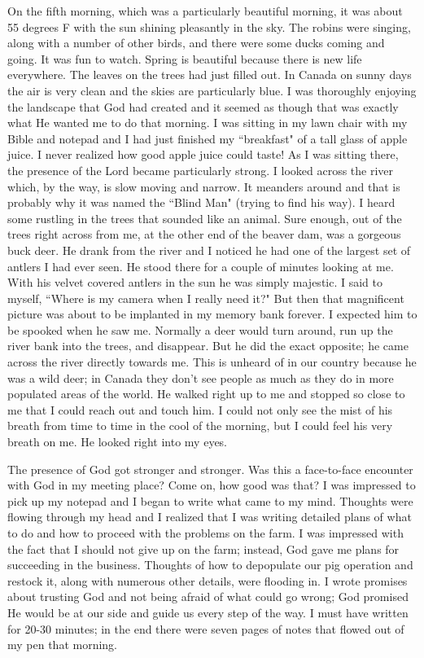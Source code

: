 \documentclass[oneside,12pt]{book}
\begin{document}
On the fifth morning, which was a particularly beautiful morning, it was about 55 degrees F with the sun shining pleasantly in the sky. The robins were singing, along with a number of other birds, and there were some ducks coming and going. It was fun to watch. Spring is beautiful because there is new life everywhere. The leaves on the trees had just filled out. In Canada on sunny days the air is very clean and the skies are particularly blue. I was thoroughly enjoying the landscape that God had created and it seemed as though that was exactly what He wanted me to do that morning. I was sitting in my lawn chair with my Bible and notepad and I had just finished my ``breakfast" of a tall glass of apple juice. I never realized how good apple juice could taste! As I was sitting there, the presence of the Lord became particularly strong. I looked across the river which, by the way, is slow moving and narrow. It meanders around and that is probably why it was named the ``Blind Man" (trying to find his way). I heard some rustling in the trees that sounded like an animal. Sure enough, out of the trees right across from me, at the other end of the beaver dam, was a gorgeous buck deer. He drank from the river and I noticed he had one of the largest set of antlers I had ever seen. He stood there for a couple of minutes looking at me. With his velvet covered antlers in the sun he was simply majestic. I said to myself, ``Where is my camera when I really need it?" But then that magnificent picture was about to be implanted in my memory bank forever. I expected him to be spooked when he saw me. Normally a deer would turn around, run up the river bank into the trees, and disappear. But he did the exact opposite; he came across the river directly towards me. This is unheard of in our country because he was a wild deer; in Canada they don't see people as much as they do in more populated areas of the world. He walked right up to me and stopped so close to me that I could reach out and touch him. I could not only see the mist of his breath from time to time in the cool of the morning, but I could feel his very breath on me. He looked right into my eyes. 

The presence of God got stronger and stronger. Was this a face-to-face encounter with God in my meeting place? Come on, how good was that? I was impressed to pick up my notepad and I began to write what came to my mind. Thoughts were flowing through my head and I realized that I was writing detailed plans of what to do and how to proceed with the problems on the farm. I was impressed with the fact that I should not give up on the farm; instead, God gave me plans for succeeding in the business. Thoughts of how to depopulate our pig operation and restock it, along with numerous other details, were flooding in. I wrote promises about trusting God and not being afraid of what could go wrong; God promised He would be at our side and guide us every step of the way. I must have written for 20-30 minutes; in the end there were seven pages of notes that flowed out of my pen that morning. 
\end{document}
